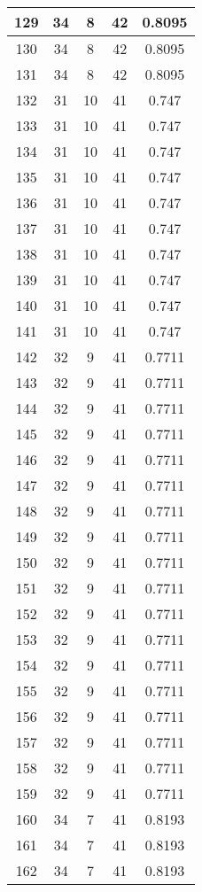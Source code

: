 \documentclass[letterpaper, 12pt]{article}
\begin{document}
\begin{longtable}{|c|c|c|c|c|}
\hline
129 & 34 & 8 & 42 & 0.8095 \\
\hline
130 & 34 & 8 & 42 & 0.8095 \\
\hline
131 & 34 & 8 & 42 & 0.8095 \\
\hline
132 & 31 & 10 & 41 & 0.747 \\
\hline
133 & 31 & 10 & 41 & 0.747 \\
\hline
134 & 31 & 10 & 41 & 0.747 \\
\hline
135 & 31 & 10 & 41 & 0.747 \\
\hline
136 & 31 & 10 & 41 & 0.747 \\
\hline
137 & 31 & 10 & 41 & 0.747 \\
\hline
138 & 31 & 10 & 41 & 0.747 \\
\hline
139 & 31 & 10 & 41 & 0.747 \\
\hline
140 & 31 & 10 & 41 & 0.747 \\
\hline
141 & 31 & 10 & 41 & 0.747 \\
\hline
142 & 32 & 9 & 41 & 0.7711 \\
\hline
143 & 32 & 9 & 41 & 0.7711 \\
\hline
144 & 32 & 9 & 41 & 0.7711 \\
\hline
145 & 32 & 9 & 41 & 0.7711 \\
\hline
146 & 32 & 9 & 41 & 0.7711 \\
\hline
147 & 32 & 9 & 41 & 0.7711 \\
\hline
148 & 32 & 9 & 41 & 0.7711 \\
\hline
149 & 32 & 9 & 41 & 0.7711 \\
\hline
150 & 32 & 9 & 41 & 0.7711 \\
\hline
151 & 32 & 9 & 41 & 0.7711 \\
\hline
152 & 32 & 9 & 41 & 0.7711 \\
\hline
153 & 32 & 9 & 41 & 0.7711 \\
\hline
154 & 32 & 9 & 41 & 0.7711 \\
\hline
155 & 32 & 9 & 41 & 0.7711 \\
\hline
156 & 32 & 9 & 41 & 0.7711 \\
\hline
157 & 32 & 9 & 41 & 0.7711 \\
\hline
158 & 32 & 9 & 41 & 0.7711 \\
\hline
159 & 32 & 9 & 41 & 0.7711 \\
\hline
160 & 34 & 7 & 41 & 0.8193 \\
\hline
161 & 34 & 7 & 41 & 0.8193 \\
\hline
162 & 34 & 7 & 41 & 0.8193 \\

\end{longtable}
\end{document}
